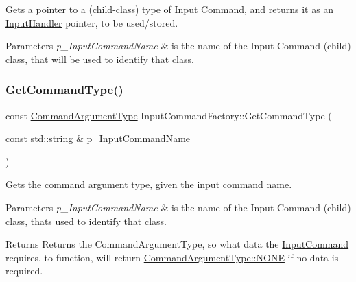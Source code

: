 Gets a pointer to a (child-\/class) type of Input Command, and returns it as an \mbox{\hyperlink{class_input_handler}{Input\+Handler}} pointer, to be used/stored. 


\begin{DoxyParams}{Parameters}
{\em p\+\_\+\+Input\+Command\+Name} & is the name of the Input Command (child) class, that will be used to identify that class. \\
\hline
\end{DoxyParams}
\mbox{\label{class_input_command_factory_a5f747618cbe98cce652dbf98cd9fa32c}} 
\subsubsection{\texorpdfstring{GetCommandType()}{GetCommandType()}}
{\footnotesize\ttfamily const \mbox{\hyperlink{_command_argument_types_8h_adefdc85c4f4f8765e96fd2f0d78b133e}{Command\+Argument\+Type}} Input\+Command\+Factory\+::\+Get\+Command\+Type (\begin{DoxyParamCaption}\item[{const std\+::string \&}]{p\+\_\+\+Input\+Command\+Name }\end{DoxyParamCaption})\hspace{0.3cm}{\ttfamily [inline]}}



Gets the command argument type, given the input command name. 


\begin{DoxyParams}{Parameters}
{\em p\+\_\+\+Input\+Command\+Name} & is the name of the Input Command (child) class, that\textquotesingle{}s used to identify that class. \\
\hline
\end{DoxyParams}
\begin{DoxyReturn}{Returns}
Returns the Command\+Argument\+Type, so what data the \mbox{\hyperlink{class_input_command}{Input\+Command}} requires, to function, will return \mbox{\hyperlink{_command_argument_types_8h_adefdc85c4f4f8765e96fd2f0d78b133eab50339a10e1de285ac99d4c3990b8693}{Command\+Argument\+Type\+::\+N\+O\+NE}} if no data is required. 
\end{DoxyReturn}
\mbox{\label{class_input_command_factory_ae05897e1e26aedb25705479016f69735}} 
